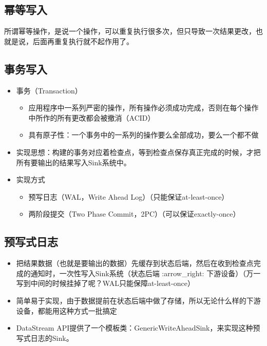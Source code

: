 \hypertarget{ux5e42ux7b49ux5199ux5165}{%
\subsection{幂等写入}\label{ux5e42ux7b49ux5199ux5165}}

所谓幂等操作，是说一个操作，可以重复执行很多次，但只导致一次结果更改，也就是说，后面再重复执行就不起作用了。

\hypertarget{ux4e8bux52a1ux5199ux5165}{%
\subsection{事务写入}\label{ux4e8bux52a1ux5199ux5165}}

\begin{itemize}
\tightlist
\item
  事务（Transaction）

  \begin{itemize}
  \tightlist
  \item
    应用程序中一系列严密的操作，所有操作必须成功完成，否则在每个操作中所作的所有更改都会被撤消（ACID）
  \item
    具有原子性：一个事务中的一系列的操作要么全部成功，要么一个都不做
  \end{itemize}
\item
  实现思想：构建的事务对应着检查点，等到检查点保存真正完成的时候，才把所有要输出的结果写入Sink系统中。
\item
  实现方式

  \begin{itemize}
  \tightlist
  \item
    预写日志（WAL，Write Ahead Log）（只能保证at-least-once）
  \item
    两阶段提交（Two Phase Commit，2PC）（可以保证exactly-once）
  \end{itemize}
\end{itemize}

\hypertarget{ux9884ux5199ux5f0fux65e5ux5fd7}{%
\subsection{预写式日志}\label{ux9884ux5199ux5f0fux65e5ux5fd7}}

\begin{itemize}
\tightlist
\item
  把结果数据（也就是要输出的数据）先缓存到状态后端，然后在收到检查点完成的通知时，一次性写入Sink系统（状态后端
  :arrow\_right:
  下游设备）（万一写到中间的时候挂掉了呢？WAL只能保障at-least-once）
\item
  简单易于实现，由于数据提前在状态后端中做了存储，所以无论什么样的下游设备，都能用这种方式一批搞定
\item
  DataStream
  API提供了一个模板类：GenericWriteAheadSink，来实现这种预写式日志的Sink。
\end{itemize}

